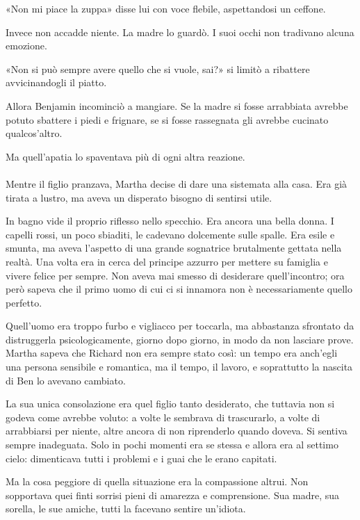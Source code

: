\documentclass[a4paper,12pt]{book}
\begin{document}
«Non mi piace la zuppa» disse lui con voce flebile, aspettandosi un ceffone.

Invece non accadde niente. La madre lo guardò. I suoi occhi non tradivano
alcuna emozione.

«Non si può sempre avere quello che si vuole, sai?» si limitò a ribattere
avvicinandogli il piatto.

Allora Benjamin incominciò a mangiare. Se la madre si fosse arrabbiata avrebbe
potuto sbattere i piedi e frignare, se si fosse rassegnata gli avrebbe cucinato
qualcos'altro.

Ma quell'apatia lo spaventava più di ogni altra reazione.

\paragraph{}
Mentre il figlio pranzava, Martha decise di dare una sistemata alla casa. Era
già tirata a lustro, ma aveva un disperato bisogno di sentirsi utile.

In bagno vide il proprio riflesso nello specchio. Era ancora una bella donna. I
capelli rossi, un poco sbiaditi, le cadevano dolcemente sulle spalle. Era esile
e smunta, ma aveva l'aspetto di una grande sognatrice brutalmente gettata nella
realtà. Una volta era in cerca del principe azzurro per mettere su famiglia e
vivere felice per sempre. Non aveva mai smesso di desiderare quell'incontro; ora
però sapeva che il primo uomo di cui ci si innamora non è necessariamente
quello perfetto.

Quell’uomo era troppo furbo e vigliacco per toccarla, ma abbastanza sfrontato
da distruggerla psicologicamente, giorno dopo giorno, in modo da non lasciare
prove. Martha sapeva che Richard non era sempre stato così: un tempo era
anch'egli una persona sensibile e romantica, ma il tempo, il lavoro, e
soprattutto la nascita di Ben lo avevano cambiato.

La sua unica consolazione era quel figlio tanto desiderato, che tuttavia non si
godeva come avrebbe voluto: a volte le sembrava di trascurarlo, a volte di
arrabbiarsi per niente, altre ancora di non riprenderlo quando doveva. Si
sentiva sempre inadeguata. Solo in pochi momenti era se stessa e allora era al
settimo cielo: dimenticava tutti i problemi e i guai che le erano capitati.

Ma la cosa peggiore di quella situazione era la compassione altrui. Non
sopportava quei finti sorrisi pieni di amarezza e comprensione. Sua madre, sua
sorella, le sue amiche, tutti la facevano sentire un'idiota.
\end{document}
